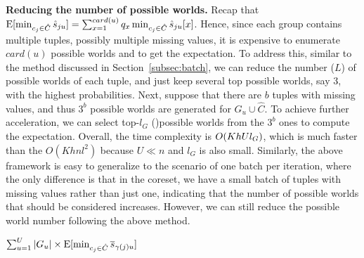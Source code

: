 \noindent \textbf{Reducing the number of possible worlds.} Recap that $\mathrm{E}[\min_{c_j\in \hat {C}}\hat{s}_{ju}] = \sum_{x=1}^{card(u)} q_x \min_{c_j \in \hat{C}} \hat{s}_{ju}[x]$.
%
 Hence, since each group contains multiple tuples, possibly multiple missing values,  it is expensive to enumerate $card(u)$ possible worlds and  to get the expectation. 
 To address this, similar to the method discussed in
 Section~\ref{subsec:batch},  we can reduce the number ($L$) of possible worlds of each tuple, and just keep several top possible worlds, say 3, with the highest probabilities. Next, suppose that there are $b$ tuples with missing values, and thus $3^b$ possible worlds are generated for $G_u \cup \hat{C}$. To achieve further acceleration,   we can  select top-$l_G$ ()possible worlds from the $3^b$ ones to compute the expectation. Overall, the time complexity is $O(KhUl_{G})$, which is much faster than the $O(Khnl^2)$ because $U \ll n$ and $l_G$ is also small. Similarly, the above framework is easy to generalize to the scenario of one batch per iteration, where the only difference is that in the coreset, we have a small batch of tuples with missing values rather than just one, indicating that the number of possible worlds that should be considered increases. However, we can still reduce the possible world number following the above method. 
 
 
  $\sum_{u=1}^U  |G_u| \times\mathrm{E}[\min_{c_j\in \hat{C}}\overline{s}_{\gamma(j)u}]$
 
